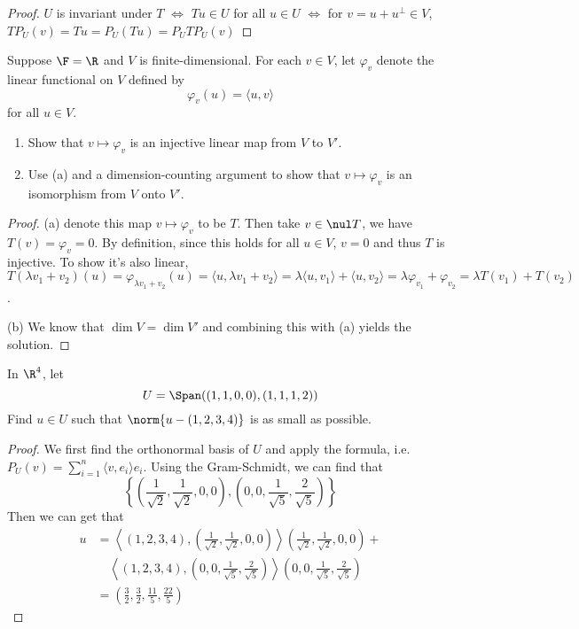 \documentclass{extarticle}
\begin{document}
\begin{proof}
\(U\) is invariant under \(T\) \(\Longleftrightarrow\) \(Tu \in U\) for all \(u \in U\)
\(\Longleftrightarrow\) for \(v = u + u^\perp \in V\), \(TP_U (v) = Tu = P_U(Tu) = P_U T P_U (v) \)
\end{proof}

\begin{problem}{13}
    Suppose \(\F = \R\) and \(V\) is finite-dimensional. For each \(v \in V\), let \(\varphi_v\) denote
    the linear functional on \(V\) defined by
    \[\varphi_v(u) = \langle u,v \rangle\]
    for all \(u \in V\).
    \begin{enumerate}[label=(\alph*)]
        \item Show that \(v \mapsto \varphi_v\) is an injective linear map from \(V\) to \(V'\).
        \item Use (a) and a dimension-counting argument to show that \(v \mapsto \varphi_v\) is an
        isomorphism from \(V\) onto \(V'\).
    \end{enumerate}
\end{problem}

\begin{proof}
(a) denote this map \(v \mapsto \varphi_v\) to be \(T\). Then take \(v \in \nul T\), we have
\(T(v) = \varphi_v = 0\). By definition, since this holds for all \(u \in V\), \(v = 0\) and thus
\(T\) is injective. To show it's also linear, \(T (\lambda v_1 + v_2) (u)
= \varphi_{\lambda v_1 + v_2} (u) = \langle u, \lambda v_1 + v_2 \rangle = \lambda \langle u,v_1 \rangle
+ \langle u,v_2 \rangle = \lambda \varphi_{v_1} + \varphi_{v_2} = \lambda T(v_1) + T(v_2) \).

(b) We know that \(\dim V = \dim V'\) and combining this with (a) yields the solution.
\end{proof}

\begin{problem}{15}
    In \(\R^4\), let
    \[U = \Span((1,1,0,0),(1,1,1,2))\]
    Find \(u \in U\) such that \(\norm{u - (1,2,3,4)}\) is as small as possible.
\end{problem}

\begin{proof}
We first find the orthonormal basis of \(U\) and apply the formula, i.e. \(P_U(v) = \sum_{i=1}^{n}
\langle v,e_i \rangle e_i\). Using the Gram-Schmidt, we can find that
\[\left\{\left(\frac{1}{\sqrt{2}}, \frac{1}{\sqrt{2}}, 0, 0 \right), \left(0, 0, \frac{1}{\sqrt{5}}, \frac{2}{\sqrt{5}}\right)\right\}\]
Then we can get that
\begin{align*}
    u &= \left\langle (1,2,3,4),\left(\frac{1}{\sqrt{2}}, \frac{1}{\sqrt{2}}, 0, 0\right) \right\rangle
\left(\frac{1}{\sqrt{2}}, \frac{1}{\sqrt{2}}, 0, 0 \right) +  \\
&\quad \left\langle (1,2,3,4),\left(0, 0, \frac{1}{\sqrt{5}}, \frac{2}{\sqrt{5}}\right) \right\rangle
\left(0, 0, \frac{1}{\sqrt{5}}, \frac{2}{\sqrt{5}}\right) \\
&= \left(\frac{3}{2}, \frac{3}{2}, \frac{11}{5}, \frac{22}{5}\right)
\end{align*}
\end{proof}
\end{document}
